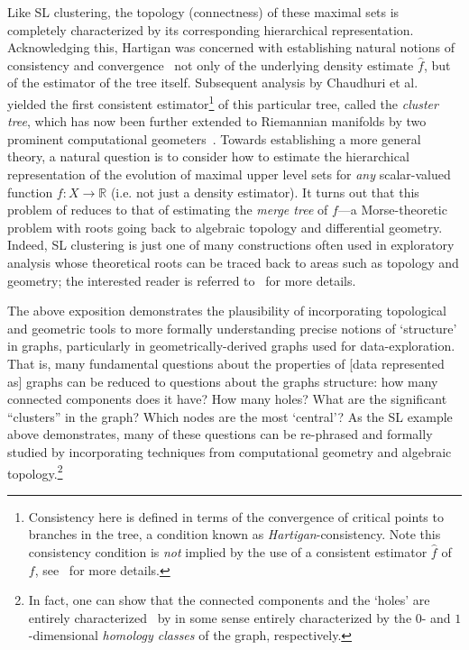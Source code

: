 \documentclass{vgtc}                          %
\begin{document}
Like SL clustering, the topology (connectness) of these maximal sets is completely characterized by its corresponding hierarchical representation. Acknowledging this, Hartigan was concerned with establishing natural notions of consistency and convergence~\cite{hartigan1981consistency} not only of the underlying density estimate $\hat{f}$, but of the estimator of the tree itself. Subsequent analysis by Chaudhuri et al.~\cite{chaudhuri2010rates} yielded the first consistent estimator\footnote{Consistency here is defined in terms of the convergence of critical points to branches in the tree, a condition known as \emph{Hartigan}-consistency. Note this consistency condition is \emph{not} implied by the use of a consistent estimator $\hat{f}$ of $f$, see~\cite{hartigan1981consistency, chaudhuri2010rates} for more details.} of this particular tree, called the \emph{cluster tree}, which has now been further extended to Riemannian manifolds by two prominent computational geometers~\cite{chazal2013persistence}. Towards establishing a more general theory, a natural question is to consider how to estimate the hierarchical representation of the evolution of maximal upper level sets for \emph{any} scalar-valued function $f : X \to \mathbb{R}$ (i.e. not just a density estimator). It turns out that this problem of reduces to that of estimating the \emph{merge tree} of $f$---a Morse-theoretic problem with roots going back to algebraic topology and differential geometry. Indeed, SL clustering is just one of many constructions often used in exploratory analysis whose theoretical roots can be traced back to areas such as topology and geometry; the interested reader is referred to~\cite{chazal2021introduction, carlsson2010classifying, carlsson2010characterization, carr2003computing, eldridge2015beyond} for more details. 

The above exposition demonstrates the plausibility of incorporating topological and geometric tools to more formally understanding precise notions of `structure' in graphs, particularly in geometrically-derived graphs used for data-exploration. That is, many fundamental questions about the properties of [data represented as] graphs can be reduced to questions about the graphs structure: how many connected components does it have? How many holes? What are the significant ``clusters'' in the graph? Which nodes are the most `central'? As the SL example above demonstrates, many of these questions can be re-phrased and formally studied by incorporating techniques from computational geometry and algebraic topology.\footnote{In fact, one can show that the connected components and the `holes' are entirely characterized~\cite{chazal2021introduction} by in some sense entirely characterized by the $0$- and $1$-dimensional \emph{homology classes} of the graph, respectively.} 
\end{document}

